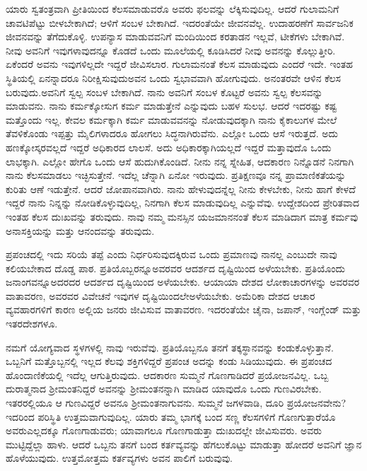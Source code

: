 ಯಾರು ಸ್ವತಂತ್ರವಾಗಿ ಪ್ರೀತಿಯಿಂದ ಕೆಲಸಮಾಡುವರೊ ಅವರು ಫಲವನ್ನು ಲೆಕ್ಕಿಸುವುದಿಲ್ಲ. ಆದರೆ ಗುಲಾಮನಿಗೆ ಚಾವಟಿಪೆಟ್ಟು ಬೀಳಬೇಕಾಗಿದೆ; ಆಳಿಗೆ ಸಂಬಳ ಬೇಕಾಗಿದೆ. ಇದರಂತೆಯೇ ಜೀವನವೆಲ್ಲ. ಉದಾಹರಣೆಗೆ ಸಾರ್ವಜನಿಕ ಜೀವನವನ್ನು ತೆಗೆದುಕೊಳ್ಳಿ. ಉಪನ್ಯಾಸ ಮಾಡುವವನಿಗೆ ಮಂದಿಯಿಂದ ಕರತಾಡನ ಇಲ್ಲವೆ, ಟೀಕೆಗಳು ಬೇಕಾಗಿವೆ. ನೀವು ಅವನಿಗೆ ಇವುಗಳಾವುದನ್ನೂ ಕೊಡದೆ ಒಂದು ಮೂಲೆಯಲ್ಲಿ ಕೂಡಿಸಿದರೆ ನೀವು ಅವನನ್ನು ಕೊಲ್ಲುತ್ತೀರಿ. ಏಕೆಂದರೆ ಅವನು ಇವುಗಳಿಲ್ಲದೇ ಇದ್ದರೆ ಜೀವಿಸಲಾರ. ಗುಲಾಮನಂತೆ ಕೆಲಸ ಮಾಡುವುದು ಎಂದರೆ ಇದೇ. ಇಂತಹ ಸ್ಥಿತಿಯಲ್ಲಿ ಏನನ್ನಾದರೂ ನಿರೀಕ್ಷಿಸುವುದು\break ಅವನ ಒಂದು ಸ್ವಭಾವವಾಗಿ ಹೋಗುವುದು. ಅನಂತರವೇ ಆಳಿನ ಕೆಲಸ ಬರುವುದು.\break ಅವನಿಗೆ ಸ್ವಲ್ಪ ಸಂಬಳ ಬೇಕಾಗಿದೆ. ನಾನು ಅವನಿಗೆ ಸಂಬಳ ಕೊಟ್ಟರೆ ಅವನು ಸ್ವಲ್ಪ ಕೆಲಸವನ್ನು ಮಾಡುವನು. ನಾನು ಕರ್ಮಕ್ಕೋಸುಗ ಕರ್ಮ ಮಾಡುತ್ತೇನೆ ಎನ್ನುವುದು ಬಹಳ ಸುಲಭ. ಆದರೆ ಇದರಷ್ಟು ಕಷ್ಟ ಮತ್ತೊಂದು ಇಲ್ಲ. ಕೇವಲ ಕರ್ಮಕ್ಕಾಗಿ ಕರ್ಮ ಮಾಡುವವನನ್ನು ನೋಡುವುದಕ್ಕಾಗಿ ನಾನು ಕೈಕಾಲುಗಳ ಮೇಲೆ ತೆವಳಿಕೊಂಡು ಇಪ್ಪತ್ತು ಮೈಲಿಗಳಾದರೂ ಹೋಗಲು ಸಿದ್ಧನಾಗಿರುವೆನು. ಎಲ್ಲೋ ಒಂದು ಆಸೆ ಇರುತ್ತದೆ. ಅದು ಹಣಕ್ಕೋಸ್ಕರವಲ್ಲದೆ ಇದ್ದರೆ ಅಧಿಕಾರದ ಲಾಲಸೆ. ಅದು ಅಧಿಕಾರಕ್ಕಾಗಿಯಲ್ಲದೆ ಇದ್ದರೆ ಮತ್ತಾವುದೊ ಒಂದು ಲಾಭಕ್ಕಾಗಿ. ಎಲ್ಲೋ ಹೇಗೊ ಒಂದು ಆಸೆ ಹುದುಗಿಕೊಂಡಿದೆ. ನೀನು ನನ್ನ ಸ್ನೇಹಿತ, ಆದಕಾರಣ ನಿನ್ನೊಡನೆ ನಿನಗಾಗಿ ನಾನು ಕೆಲಸಮಾಡಲು ಇಚ್ಛಿಸುತ್ತೇನೆ. ಇದೆಲ್ಲ ಚೆನ್ನಾಗಿ ಏನೋ ಇರುವುದು. ಪ್ರತಿಕ್ಷಣವೂ ನನ್ನ ಪ್ರಾಮಾಣಿಕತೆಯನ್ನು ಕುರಿತು ಆಣೆ ಇಡುತ್ತೇನೆ. ಆದರೆ ಜೋಪಾನವಾಗಿರು. ನಾನು ಹೇಳುವುದನ್ನೆಲ್ಲ ನೀನು ಕೇಳಬೇಕು, ನೀನು ಹಾಗೆ ಕೇಳದೆ ಇದ್ದರೆ ನಾನು ನಿನ್ನನ್ನು ನೋಡಿಕೊಳ್ಳುವುದಿಲ್ಲ, ನಿನಗಾಗಿ ಕೆಲಸ ಮಾಡುವುದಿಲ್ಲ ಎನ್ನುವೆವು. ಉದ್ದೇಶದಿಂದ ಪ್ರೇರಿತವಾದ ಇಂತಹ ಕೆಲಸ ದುಃಖವನ್ನು ತರುವುದು. ನಾವು ನಮ್ಮ ಮನಸ್ಸಿನ ಯಜಮಾನನಂತೆ ಕೆಲಸ ಮಾಡಿದಾಗ ಮಾತ್ರ ಕರ್ಮವು ಅನಾಸಕ್ತಿಯನ್ನು ಮತ್ತು ಆನಂದವನ್ನು ತರುವುದು.

ಪ್ರಪಂಚದಲ್ಲಿ ಇದು ಸರಿಯೆ ತಪ್ಪೆ ಎಂದು ನಿರ್ಧರಿಸುವುದಕ್ಕಿರುವ ಒಂದು ಪ್ರಮಾ\-ಣವು ನಾನಲ್ಲ ಎಂಬುದೇ ನಾವು ಕಲಿಯಬೇಕಾದ ದೊಡ್ಡ ಪಾಠ. ಪ್ರತಿಯೊಬ್ಬರನ್ನೂ\break ಅವರವರ ಆದರ್ಶದ ದೃಷ್ಟಿಯಿಂದ ಅಳೆಯಬೇಕು. ಪ್ರತಿಯೊಂದು ಜನಾಂಗವನ್ನೂ\break ಅದರದರ ಆದರ್ಶದ ದೃಷ್ಟಿಯಿಂದ ಅಳೆಯಬೇಕು. ಆಯಾಯಾ ದೇಶದ ಲೋಕಾಚಾರಗಳನ್ನು ಅವರವರ ವಾತಾವರಣ, ಅವರವರ ವಿವೇಚನೆ ಇವುಗಳ ದೃಷ್ಟಿಯಿಂದಲೇ\break ಅಳೆಯಬೇಕು. ಅಮೆರಿಕಾ ದೇಶದ ಆಚಾರ ವ್ಯವಹಾರಗಳಿಗೆ ಕಾರಣ ಅಲ್ಲಿಯ ಜನರು ಜೀವಿಸುವ ವಾತಾವರಣ. ಇದರಂತೆಯೇ ಚೈನಾ, ಜಪಾನ್​, ಇಂಗ್ಲೆಂಡ್​ ಮತ್ತು ಇತರ\break ದೇಶಗಳೂ.

\vskip 3pt

ನಮಗೆ ಯೋಗ್ಯವಾದ ಸ್ಥಳಗಳಲ್ಲಿ ನಾವು ಇರುವೆವು. ಪ್ರತಿಯೊಬ್ಬನೂ ತನಗೆ ತಕ್ಕ\break ಸ್ಥಾನವನ್ನು ಕಂಡುಕೊಳ್ಳುತ್ತಾನೆ. ಒಬ್ಬನಿಗೆ ಮತ್ತೊಬ್ಬನಲ್ಲಿ ಇಲ್ಲದ ಕೆಲವು ಶಕ್ತಿಗಳಿದ್ದರೆ ಪ್ರಪಂಚ ಅದನ್ನು ಕಂಡು ಸಿಡಿಯುವುದು. ಈ ಪ್ರಪಂಚದ ಹೊಂದಾಣಿಕೆಯಲ್ಲಿ ಇದೆಲ್ಲ ಆಗುತ್ತಿರುವುದು. ಆದಕಾರಣ ಸುಮ್ಮನೆ ಗೊಣಗಾಡಿದರೆ ಪ್ರಯೋಜನವಿಲ್ಲ. ಒಬ್ಬ ದುರಾತ್ಮನಾದ ಶ‍್ರೀಮಂತನಿದ್ದರೆ ಅವನನ್ನು ಶ‍್ರೀಮಂತನನ್ನಾಗಿ ಮಾಡಿದ ಯಾವುದೊ ಒಂದು ಗುಣವಿರಬೇಕು. ಇತರರಲ್ಲಿಯೂ ಆ ಗುಣವಿದ್ದರೆ ಅವನೂ ಶ‍್ರೀಮಂತನಾಗುವನು. ಸುಮ್ಮನೆ ಜಗಳವಾಡಿ, ದೂರಿ ಪ್ರಯೋಜನವೇನು? ಇದರಿಂದ ಪರಿಸ್ಥಿತಿ ಉತ್ತಮವಾಗುವುದಿಲ್ಲ. ಯಾರು ತಮ್ಮ ಭಾಗಕ್ಕೆ ಬಂದ ಸಣ್ಣ ಕೆಲಸಗಳಿಗೆ ಗೊಣಗುತ್ತಾರೆಯೊ ಅವರು\break ಎಲ್ಲದಕ್ಕೂ ಗೊಣಗಾಡುವರು; ಯಾವಾಗಲೂ ಗೊಣಗಾಡುತ್ತಾ ದುಃಖದಲ್ಲೇ ಜೀವಿಸುವರು. ಅವರು ಮುಟ್ಟಿದ್ದೆಲ್ಲಾ ಹಾಳು. ಆದರೆ ಒಬ್ಬನು ತನಗೆ ಬಂದ ಕರ್ತವ್ಯವನ್ನು ಹೆಗಲುಕೊಟ್ಟು ಮಾಡುತ್ತಾ ಹೋದರೆ ಅವನಿಗೆ ಜ್ಞಾನ ಹೊಳೆಯುವುದು. ಉತ್ತಮೋತ್ತಮ ಕರ್ತವ್ಯಗಳು ಅವನ ಪಾಲಿಗೆ ಬರುವುವು.

\vspace{-0.6cm}

